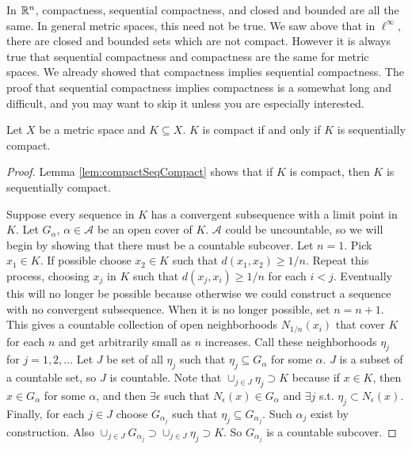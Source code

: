 In $\mathbb{R}^n$, compactness, sequential compactness, and closed and bounded
are all the same. In general metric spaces, this need not be true. We
saw above that in $\ell^\infty$, there are
closed and bounded sets which are not compact.  However it is always
true that sequential compactness and compactness are the same for
metric spaces. We already showed that compactness implies sequential
compactness.  The proof that sequential compactness implies
compactness is a somewhat long and difficult, and you may want to skip
it unless you are especially interested.
\begin{theorem}
  Let $X$ be a metric space and $K \subseteq X$. $K$ is compact if and
  only if $K$ is sequentially compact. 
\end{theorem}
\begin{proof}
  Lemma \ref{lem:compactSeqCompact} shows that if $K$ is compact, then
  $K$ is sequentially compact.
  
  Suppose every sequence in $K$ has a convergent subsequence with a
  limit point in $K$. Let $G_{\alpha}$, $\alpha \in \mathcal{A}$ be an
  open cover of $K$. $\mathcal{A}$ could be uncountable, so we will
  begin by showing that there must be a countable subcover.  Let
  $n=1$. Pick $x_1 \in K$. If possible choose $x_2 \in K$ such that
  $d(x_1,x_2) \geq 1/n$. Repeat this process, choosing $x_j$ in $K$
  such that $d(x_j,x_i) \geq 1/n$ for each $i<j$. Eventually this will
  no longer be possible because otherwise we could construct a
  sequence with no convergent subsequence. When it is no longer
  possible, set $n = n+1$. This gives a countable collection of open
  neighborhoods $N_{1/n}(x_i)$ that cover $K$ for each $n$ and get
  arbitrarily small as $n$ increases. Call these neighborhoods
  $\eta_j$ for $j = 1,2,..$. Let $J$ be set of all $\eta_j$ such that
  $\eta_j \subseteq G_\alpha$ for some $\alpha$. $J$ is a subset of a
  countable set, so $J$ is countable. Note that $\cup_{j \in J} \eta_j
  \supset K$ because if $x \in K$, then $x \in G_\alpha$ for some
  $\alpha$, and then $\exists \epsilon$ such that $N_{\epsilon}(x) \in
  G_{\alpha}$ and $\exists j$ s.t. $\eta_j \subset N_{\epsilon}(x)$.
  Finally, for each $j \in J$ choose $G_{\alpha_j}$ such that $\eta_j
  \subseteq G_{\alpha_j}$. Such $\alpha_j$ exist by construction. Also
  $\cup_{j \in J} G_{\alpha_j} \supset \cup_{j \in J} \eta_j \supset
  K$. So $G_{\alpha_j}$ is a countable subcover.


\end{proof}

